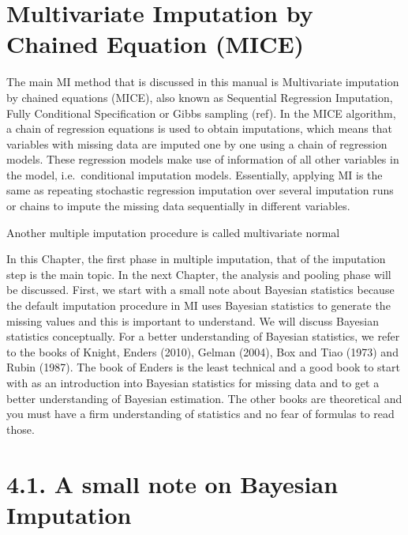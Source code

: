 \documentclass[]{book}
\theoremstyle{definition}
\theoremstyle{definition}
\theoremstyle{definition}
\theoremstyle{remark}
\begin{document}
\section{Multivariate Imputation by Chained Equation
(MICE)}\label{multivariate-imputation-by-chained-equation-mice}

The main MI method that is discussed in this manual is Multivariate
imputation by chained equations (MICE), also known as Sequential
Regression Imputation, Fully Conditional Specification or Gibbs sampling
(ref). In the MICE algorithm, a chain of regression equations is used to
obtain imputations, which means that variables with missing data are
imputed one by one using a chain of regression models. These regression
models make use of information of all other variables in the model,
i.e.~conditional imputation models. Essentially, applying MI is the same
as repeating stochastic regression imputation over several imputation
runs or chains to impute the missing data sequentially in different
variables.

Another multiple imputation procedure is called multivariate normal

In this Chapter, the first phase in multiple imputation, that of the
imputation step is the main topic. In the next Chapter, the analysis and
pooling phase will be discussed. First, we start with a small note about
Bayesian statistics because the default imputation procedure in MI uses
Bayesian statistics to generate the missing values and this is important
to understand. We will discuss Bayesian statistics conceptually. For a
better understanding of Bayesian statistics, we refer to the books of
Knight, Enders (2010), Gelman (2004), Box and Tiao (1973) and Rubin
(1987). The book of Enders is the least technical and a good book to
start with as an introduction into Bayesian statistics for missing data
and to get a better understanding of Bayesian estimation. The other
books are theoretical and you must have a firm understanding of
statistics and no fear of formulas to read those.

\section{4.1. A small note on Bayesian
Imputation}\label{a-small-note-on-bayesian-imputation}
\end{document}
